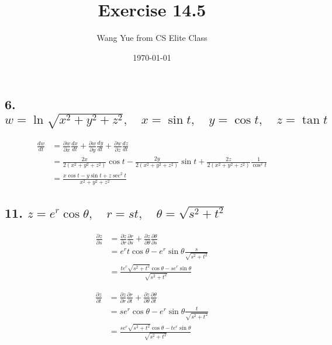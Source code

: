 \documentclass{article}
\begin{document}
    \title{Exercise 14.5}
    \author{Wang Yue from CS Elite Class}
    \date{\today}
    \maketitle

    \subsection*{6. $w = \ln \sqrt{x^2+y^2+z^2}, \quad x = \sin t, \quad y = \cos t, \quad z = \tan t$}

    $$\begin{aligned}
        \frac{dw}{dt} &= \frac{\partial w}{\partial x}\frac{dx}{dt} + \frac{\partial w}{\partial y}\frac{dy}{dt} + \frac{\partial w}{\partial z}\frac{dz}{dt} \\
        &= \frac{2x}{2(x^2+y^2+z^2)}\cos t - \frac{2y}{2(x^2+y^2+z^2)}\sin t + \frac{2z}{2(x^2+y^2+z^2)}\frac{1}{\cos^2 t} \\
        &= \frac{x\cos t - y\sin t + z\sec^2 t}{x^2+y^2+z^2}
    \end{aligned}$$
    
    \subsection*{11. $z = e^r \cos \theta, \quad r = st, \quad \theta = \sqrt{s^2+t^2}$}

    $$\begin{aligned}
        \frac{\partial z}{\partial s} &= \frac{\partial z}{\partial r}\frac{\partial r}{\partial s} + \frac{\partial z}{\partial \theta}\frac{\partial \theta}{\partial s} \\
        &= e^r t \cos \theta -e^r \sin \theta \frac{s}{\sqrt{s^2+t^2}} \\
        &= \frac{te^r \sqrt{s^2+t^2} \cos \theta - se^r \sin \theta}{\sqrt{s^2+t^2}}
    \end{aligned}$$

    $$\begin{aligned}
        \frac{\partial z}{\partial t} &= \frac{\partial z}{\partial r}\frac{\partial r}{\partial t} + \frac{\partial z}{\partial \theta}\frac{\partial \theta}{\partial t} \\
        &= se^r \cos \theta -e^r \sin \theta \frac{t}{\sqrt{s^2+t^2}} \\
        &= \frac{se^r\sqrt{s^2+t^2} \cos \theta - te^r \sin \theta}{\sqrt{s^2+t^2}}
    \end{aligned}$$
\end{document}
